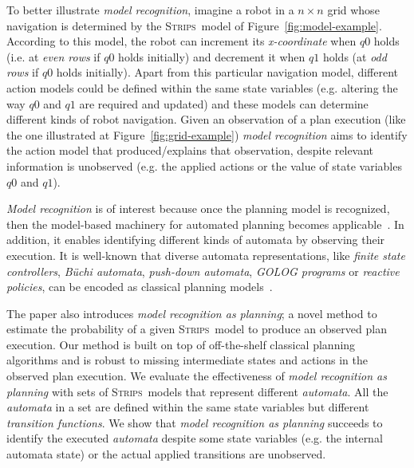 \documentclass[letterpaper]{article} %
\newcommand{\strips}{\textsc{Strips}}     %
\begin{document}
To better illustrate {\em model recognition}, imagine a robot in a $n\times n$ grid whose navigation is determined by the \strips\ model of Figure~\ref{fig:model-example}. According to this model, the robot can increment its {\em x-coordinate} when {\tt\small $q0$} holds (i.e. at {\em even rows} if {\tt\small $q0$} holds initially) and decrement it when {\tt\small $q1$} holds (at {\em odd rows} if {\tt\small $q0$} holds initially). Apart from this particular navigation model, different action models could be defined within the same state variables (e.g. altering the way {\tt\small $q0$} and {\tt\small $q1$} are required and updated) and these models can determine different kinds of robot navigation. Given an observation of a plan execution (like the one illustrated at Figure~\ref{fig:grid-example}) {\em model recognition} aims to identify the action model that produced/explains that observation, despite relevant information is unobserved (e.g. the applied actions or the value of state variables {\small\tt $q0$} and {\small\tt $q1$}). 

{\em Model recognition} is of interest because once the planning model is recognized, then the model-based machinery for automated planning becomes applicable~\cite{ghallab2004automated}. In addition, it enables identifying different kinds of automata by observing their execution. It is well-known that diverse automata representations, like {\em finite state controllers}, {\em B\"{u}chi automata}, {\em push-down automata}, {\em {\sc GOLOG} programs} or {\em reactive policies}, can be encoded as classical planning models~\cite{baier2007exploiting,Geffner:FSM:AAAI10,patrizi2011computing,ivankovic2015optimal,segovia2017generating}.

The paper also introduces {\em model recognition as planning}; a novel method to estimate the probability of a given \strips\ model to produce an observed plan execution. Our method is built on top of off-the-shelf classical planning algorithms and is robust to missing intermediate states and actions in the observed plan execution. We evaluate the effectiveness of {\em model recognition as planning} with sets of \strips\ models that represent different {\em automata}. All the {\em automata} in a set are defined within the same state variables but different {\em transition functions}. We show that {\em model recognition as planning} succeeds to identify the executed {\em automata} despite some state variables (e.g. the internal automata state) or the actual applied transitions are unobserved.
\end{document}
